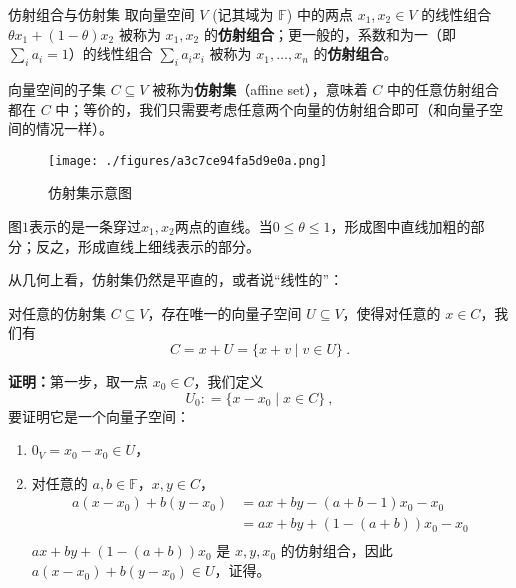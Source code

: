 
\begin{issues}
\issueTODO
\end{issues}



\begin{definition}{仿射组合与仿射集}
取向量空间 $V$ (记其域为 $\mathbb{F}$) 中的两点 $x_1, x_2 \in V$ 的线性组合 $\theta x_1 + (1 - \theta) x_2$ 被称为 $x_1, x_2$ 的\textbf{仿射组合}；更一般的，系数和为一（即$\sum_i a_i = 1$）的线性组合 $\sum_i a_i x_i$ 被称为 $x_1, \dots, x_n$ 的\textbf{仿射组合}。

向量空间的子集 $C \subseteq V$ 被称为\textbf{仿射集}（affine set），意味着 $C$ 中的任意仿射组合都在 $C$ 中；等价的，我们只需要考虑任意两个向量的仿射组合即可（和向量子空间的情况一样）。
\end{definition}

\begin{figure}[ht]
\centering
\texttt{[image: ./figures/a3c7ce94fa5d9e0a.png]}
\caption{仿射集示意图} \label{fig_AffSet_1}
\end{figure}

图$1$表示的是一条穿过$x_1,x_2$两点的直线。当$0 \leq \theta \leq 1$，形成图中直线加粗的部分；反之，形成直线上细线表示的部分。

从几何上看，仿射集仍然是平直的，或者说“线性的”：

\begin{theorem}{}
对任意的仿射集 $C \subseteq V$，存在唯一的向量子空间 $U \subseteq V$，使得对任意的 $x \in C$，我们有
\begin{equation}
C = x + U = \{ x + v \mid v \in U\}~.
\end{equation}
\end{theorem}

\textbf{证明：}第一步，取一点 $x_0 \in C$，我们定义
\begin{equation}
U_0: = \{ x - x_0 \mid x \in C \}~,
\end{equation}
要证明它是一个向量子空间：
\begin{enumerate}
\item $0_V = x_0 - x_0 \in U$，
\item 对任意的 $a, b \in \mathbb{F}$，$x, y \in C$，
    \begin{equation}
    \begin{aligned}
    a (x - x_0) + b (y - x_0) &= a x + b y - (a + b - 1) x_0 - x_0 \\
    &= a x + b y + (1 - (a + b)) x_0 - x_0 \\
    \end{aligned}~
    \end{equation}
$a x + b y + (1 - (a + b)) x_0$ 是 $x, y, x_0$ 的仿射组合，因此 $a (x - x_0) + b (y - x_0) \in U$，证得。
\end{enumerate}

